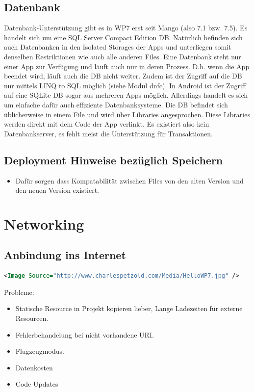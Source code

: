 \documentclass[a4paper,10pt]{scrreprt}
\begin{document}
\section{Datenbank}
Datenbank-Unterstützung gibt es in WP7 erst seit Mango (also 7.1 bzw. 7.5). Es handelt sich um eine SQL Server
Compact Edition DB. Natürlich befinden sich auch Datenbanken in den Isolated Storages der Apps und
unterliegen somit denselben Restriktionen wie auch alle anderen Files. Eine Datenbank steht nur einer App zur
Verfügung und läuft auch nur in deren Prozess. D.h. wenn die App beendet wird, läuft auch die DB nicht weiter.
Zudem ist der Zugriff auf die DB nur mittels LINQ to SQL möglich (siehe Modul dnfc).
In Android ist der Zugriff auf eine SQLite DB sogar aus mehreren Apps möglich. Allerdings handelt es sich um
einfache dafür auch effiziente Datenbanksysteme. Die DB befindet sich üblicherweise in einem File und wird
über Libraries angesprochen. Diese Libraries werden direkt mit dem Code der App verlinkt. Es existiert also kein
Datenbankserver, es fehlt meist die Unterstützung für Transaktionen.

\section{Deployment Hinweise bezüglich Speichern}
\begin{itemize}
 \item Dafür sorgen dass Kompatabilität zwischen Files von den alten Version und den neuen Version existiert.
\end{itemize}

\chapter{Networking}

\section{Anbindung ins Internet}
\begin{lstlisting}[language=xml]
 <Image Source="http://www.charlespetzold.com/Media/HelloWP7.jpg" />
\end{lstlisting}

Probleme:
\begin{itemize}
 \item Statische Resource in Projekt kopieren lieber, Lange Ladezeiten für externe Resourcen.
 \item Fehlerbehandelung bei nicht vorhandene URI.
 \item Flugzeugmodus.
 \item Datenkosten
 \item Code Updates
\end{itemize}
\end{document}
